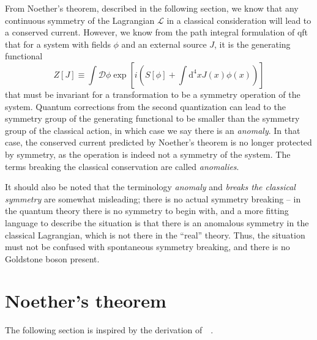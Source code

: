 
From Noether's theorem, described in the following section, we know that any continuous symmetry of the Lagrangian $\mathcal{L}$ in a classical consideration will lead to a conserved current.
However, we know from the path integral formulation of \gls{qft} that for a system with fields $\phi $ and an external source $J$, it is the generating functional
\begin{equation}
  \label{eq:generating_functional}
  Z[J] \equiv
  \int \mathcal{D}\phi 
  \exp \left[
  i \left( S[\phi] + \int \mathrm{d}^4x J(x) \phi(x) \right)
  \right] 
\end{equation}
that must be invariant for a transformation to be a symmetry operation of the system.
Quantum corrections from the second quantization can lead to the symmetry group of the generating functional to be smaller than the symmetry group of the classical action, in which case we say there is an \emph{anomaly}.
In that case, the conserved current predicted by Noether's theorem is no longer protected by symmetry, as the operation is indeed not a symmetry of the system.
The terms breaking the classical conservation are called \emph{anomalies}.

It should also be noted that the terminology \emph{anomaly} and \emph{breaks the classical symmetry} are somewhat misleading;
there is no actual symmetry breaking -- in the quantum theory there is no symmetry to begin with, and a more fitting language to describe the situation is that there is an anomalous symmetry in the classical Lagrangian, which is not there in the ``real'' theory.
Thus, the situation must not be confused with spontaneous symmetry breaking, and there is no Goldstone boson present.

\section{Noether's theorem}
The following section is inspired by the derivation of~\citeauthor{kachelriessQuantumFieldsHubble2018}~\cite{kachelriessQuantumFieldsHubble2018}.

